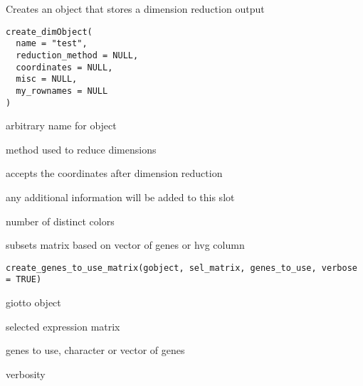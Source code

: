 \documentclass[a4paper]{book}
\begin{document}
%
\begin{Description}\relax
Creates an object that stores a dimension reduction output
\end{Description}
%
\begin{Usage}
\begin{verbatim}
create_dimObject(
  name = "test",
  reduction_method = NULL,
  coordinates = NULL,
  misc = NULL,
  my_rownames = NULL
)
\end{verbatim}
\end{Usage}
%
\begin{Arguments}
\begin{ldescription}
\item[\code{name}] arbitrary name for object

\item[\code{reduction\_method}] method used to reduce dimensions

\item[\code{coordinates}] accepts the coordinates after dimension reduction

\item[\code{misc}] any additional information will be added to this slot
\end{ldescription}
\end{Arguments}
%
\begin{Value}
number of distinct colors
\end{Value}
%
\begin{Description}\relax
subsets matrix based on vector of genes or hvg column
\end{Description}
%
\begin{Usage}
\begin{verbatim}
create_genes_to_use_matrix(gobject, sel_matrix, genes_to_use, verbose = TRUE)
\end{verbatim}
\end{Usage}
%
\begin{Arguments}
\begin{ldescription}
\item[\code{gobject}] giotto object

\item[\code{sel\_matrix}] selected expression matrix

\item[\code{genes\_to\_use}] genes to use, character or vector of genes

\item[\code{verbose}] verbosity
\end{ldescription}
\end{Arguments}
\end{document}
